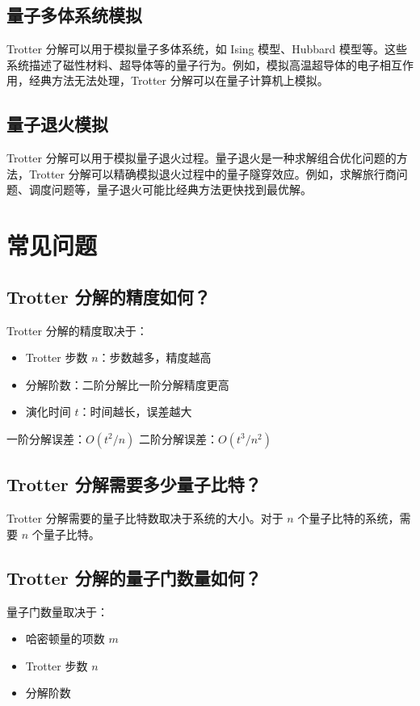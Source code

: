 \documentclass[12pt,a4paper]{article}
\begin{document}
\subsection{量子多体系统模拟}

Trotter 分解可以用于模拟量子多体系统，如 Ising 模型、Hubbard 模型等。这些系统描述了磁性材料、超导体等的量子行为。例如，模拟高温超导体的电子相互作用，经典方法无法处理，Trotter 分解可以在量子计算机上模拟。

\subsection{量子退火模拟}

Trotter 分解可以用于模拟量子退火过程。量子退火是一种求解组合优化问题的方法，Trotter 分解可以精确模拟退火过程中的量子隧穿效应。例如，求解旅行商问题、调度问题等，量子退火可能比经典方法更快找到最优解。

\section{常见问题}

\subsection{Trotter 分解的精度如何？}

Trotter 分解的精度取决于：
\begin{itemize}
  \item Trotter 步数 $n$：步数越多，精度越高
  \item 分解阶数：二阶分解比一阶分解精度更高
  \item 演化时间 $t$：时间越长，误差越大
\end{itemize}

一阶分解误差：$O(t^2/n)$
二阶分解误差：$O(t^3/n^2)$

\subsection{Trotter 分解需要多少量子比特？}

Trotter 分解需要的量子比特数取决于系统的大小。对于 $n$ 个量子比特的系统，需要 $n$ 个量子比特。

\subsection{Trotter 分解的量子门数量如何？}

量子门数量取决于：
\begin{itemize}
  \item 哈密顿量的项数 $m$
  \item Trotter 步数 $n$
  \item 分解阶数
\end{itemize}
\end{document}
